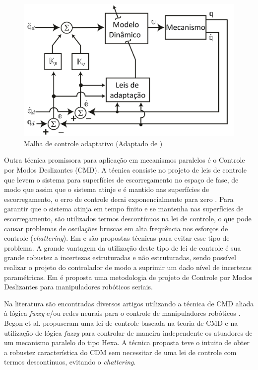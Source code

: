 \documentclass[]{politex}
\begin{document}
\begin{figure}[h]
	\centering
	\includegraphics[scale=0.385]{../figures/CA.jpg}  
	\caption{Malha de controle adaptativo (Adaptado de \cite{Craig})}
	\label{fig:CA}
\end{figure}

Outra técnica promissora para aplicação em mecanismos paralelos é o Controle por Modos Deslizantes (CMD). A técnica consiste no projeto de leis de controle que levem o sistema para superfícies de escorregamento no espaço de fase, de modo que assim que o sistema atinje e é mantido nas superfícies de escorregamento, o erro de controle decai exponencialmente para zero \cite{Slotini}. Para garantir que o sistema atinja em tempo finito e se mantenha nas superfícies de escorregamento, são utilizados termos descontínuos na lei de controle, o que pode causar problemas de oscilações bruscas em alta frequência nos esforços de controle ({\em chattering}). Em \cite{Guldner}  e  \cite{Utkin2} são propostas técnicas para evitar esse tipo de problema. A grande vantagem da utilização deste tipo de lei de controle é sua grande robustez a incertezas estruturadas e não estruturadas, sendo possível realizar o projeto do controlador de modo a suprimir um dado nível de incertezas paramétricas. Em \cite{SlotiniSMC} é proposta uma metodologia de projeto de Controle por Modos Deslizantes para manipuladores robóticos seriais.

Na literatura são encontradas diversos artigos utilizando a técnica de CMD aliada à lógica {\em fuzzy} e/ou redes neurais para o controle de manipuladores robóticos \cite{Begon, Ertugrul, Hu, Sadati}. Begon et al. \cite{Begon} propuseram uma lei de controle baseada na teoria de CMD e na utilização de lógica {\em fuzzy} para controlar de maneira independente os atuadores de um mecanismo paralelo do tipo Hexa. A técnica proposta teve o intuito de obter a robustez característica do CDM sem necessitar de uma lei de controle com termos descontínuos, evitando o {\em chattering}.
\end{document}
